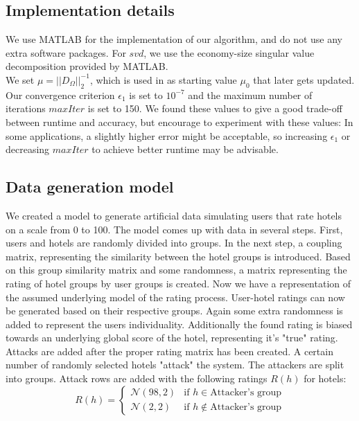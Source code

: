 \documentclass[10pt,conference,compsocconf]{IEEEtran}
\begin{document}
\subsection{Implementation details}

We use MATLAB for the implementation of our algorithm, and do not use any extra software packages.
For $svd$, we use the economy-size singular value decomposition provided by MATLAB. \\

We set $\mu = ||D_{\Omega}||_2^{-1}$, which is used in \cite{almpaper} as starting value $\mu_0$ that later gets updated. \\

Our convergence criterion $\epsilon_1$ is set to $10^{-7}$ and the maximum number of iterations $maxIter$ is set to 150. We found these values to give a good trade-off between runtime and accuracy, but encourage to experiment with these values: In some applications, a slightly higher error might be acceptable, so increasing $\epsilon_1$ or decreasing $maxIter$ to achieve better runtime may be advisable.


\subsection{Data generation model}\label{subsec:datageneration}

We created a model to generate artificial data simulating users that rate hotels on a scale from 0 to 100. The model comes up with data in several steps. First, users and hotels are randomly divided into groups. In the next step, a coupling matrix, representing the similarity between the hotel groups is introduced. Based on this group similarity matrix and some randomness, a matrix representing the rating of hotel groups by user groups is created. Now we have a representation of the assumed underlying model of the rating process. User-hotel ratings can now be generated based on their respective groups. Again some extra randomness is added to represent the users individuality. Additionally the found rating is biased towards an underlying global score of the hotel, representing it's "true" rating.\\
Attacks are added after the proper rating matrix has been created. A certain number of randomly selected hotels "attack" the system. The attackers are split into groups. Attack rows are added with the following ratings $R(h)$ for hotels:
\begin{equation*}
R(h) =
\left\{
	\begin{array}{ll}
		\mathcal{N}(98,2)  & \mbox{if } h \in \mbox{Attacker's group} \\
		\mathcal{N}(2,2) & \mbox{if } h \notin \mbox{Attacker's group}
	\end{array}
\right.
\label{eq:}
\end{equation*}
\end{document}
